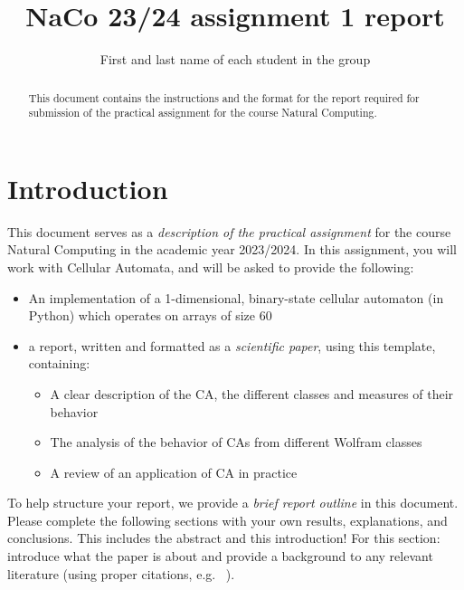 \documentclass[runningheads]{llncs}
\begin{document}
%
\title{NaCo 23/24 assignment 1 report}

\author{First and last name of each student in the group}
%

%
\maketitle %
%

\begin{abstract}
This document contains the instructions and the format for the report required for submission of the practical assignment for the course Natural Computing. 
\end{abstract}

\section{Introduction}
This document serves as a \textit{description of the practical assignment} for the course Natural Computing in the academic year 2023/2024. 
In this assignment, you will work with Cellular Automata, and will be asked to provide the following:
\begin{itemize}
    \item An implementation of a 1-dimensional, binary-state cellular automaton (in Python) which operates on arrays of size 60
    \item a report, written and formatted as a \textit{scientific paper}, using this template, containing:
    \begin{itemize}
        \item A clear description of the CA, the different classes and measures of their behavior
        \item The analysis of the behavior of CAs from different Wolfram classes
        \item A review of an application of CA in practice
    \end{itemize}
\end{itemize}

To help structure your report, we provide a \textit{brief report outline} in this document. Please complete the following sections with your own results, explanations, and conclusions. This includes the abstract and this introduction! For this section: introduce what the paper is about and provide a background to any relevant literature (using proper citations, e.g. ~\cite{wolfram1983statistical}).
\end{document}
